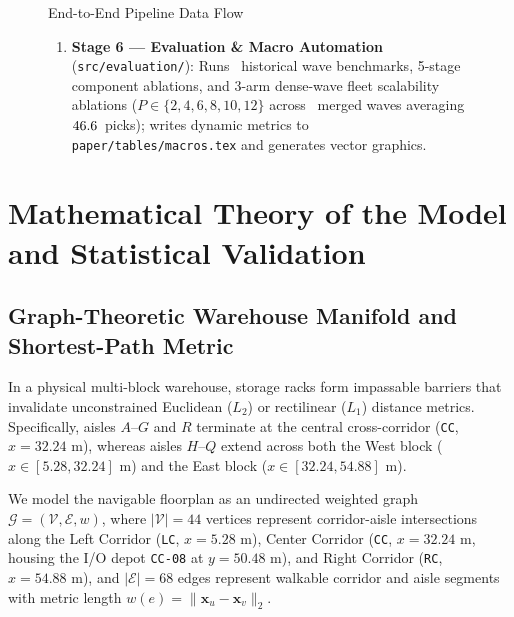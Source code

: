 \documentclass[11pt,a4paper]{article}
\begin{document}
\begin{figure}[h!]
\begin{callout}{End-to-End Pipeline Data Flow}
\begin{enumerate}[leftmargin=*]
\begin{itemize}
        \item Proposed: \textbf{CAST-Wave} (5-zone topological sector clustering, capacity-constrained batch allocation with $C = 27\text{ units}$, and dynamic congestion-penalized 2-Opt tour sequencing with $\lambda = 15.0\text{ m}$).
    \end{itemize}
    \item \textbf{Stage 6 --- Evaluation \& Macro Automation} (\texttt{src/evaluation/}): Runs \BenchmarkWaves~historical wave benchmarks, 5-stage component ablations, and 3-arm dense-wave fleet scalability ablations ($P \in \{2, 4, 6, 8, 10, 12\}$ across \DenseWavesCount~merged waves averaging $46.6$~picks); writes dynamic metrics to \texttt{paper/tables/macros.tex} and generates vector graphics.
\end{enumerate}
\end{callout}
\end{figure}

\newpage
\section{Mathematical Theory of the Model and Statistical Validation}
\label{sec:theory}

\subsection{Graph-Theoretic Warehouse Manifold and Shortest-Path Metric}
In a physical multi-block warehouse, storage racks form impassable barriers that invalidate unconstrained Euclidean ($L_2$) or rectilinear ($L_1$) distance metrics. Specifically, aisles $A$--$G$ and $R$ terminate at the central cross-corridor (\texttt{CC}, $x = 32.24\text{ m}$), whereas aisles $H$--$Q$ extend across both the West block ($x \in [5.28, 32.24]\text{ m}$) and the East block ($x \in [32.24, 54.88]\text{ m}$).

We model the navigable floorplan as an undirected weighted graph $\mathcal{G} = (\mathcal{V}, \mathcal{E}, w)$, where $|\mathcal{V}| = 44$ vertices represent corridor-aisle intersections along the Left Corridor (\texttt{LC}, $x = 5.28\text{ m}$), Center Corridor (\texttt{CC}, $x = 32.24\text{ m}$, housing the I/O depot \texttt{CC-08} at $y = 50.48\text{ m}$), and Right Corridor (\texttt{RC}, $x = 54.88\text{ m}$), and $|\mathcal{E}| = 68$ edges represent walkable corridor and aisle segments with metric length $w(e) = \| \mathbf{x}_u - \mathbf{x}_v \|_2$.
\end{document}

